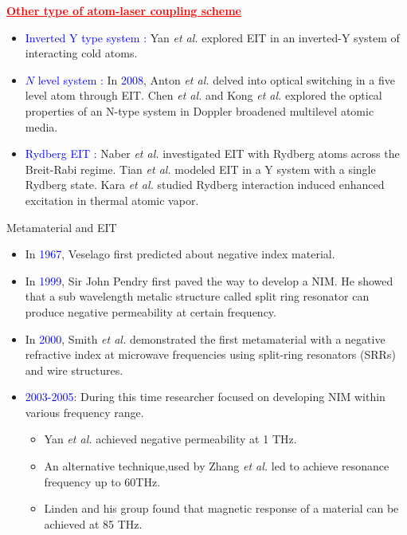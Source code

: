 \documentclass[9pt,aspectratio94]{beamer}
\begin{document}
\begin{frame}
\begin{center}
    \textcolor{red}{\underline{\textbf{Other type of atom-laser coupling scheme}}}
\end{center}

\begin{itemize}
    \item \textcolor{blue}{Inverted Y type system :} Yan \textit{et al.} explored EIT in an inverted-Y system of interacting cold atoms.
   
    \item \textcolor{blue}{$N$ level system :} In \textcolor{blue}{2008}, Anton \textit{et al.} delved into optical switching in a five level atom through EIT. Chen \textit{et al.} and Kong \textit{et al.} explored the optical properties of an N-type system in Doppler broadened multilevel atomic media.
    \item \textcolor{blue}{Rydberg EIT :} Naber \textit{et al.} investigated EIT with Rydberg atoms across the Breit-Rabi regime. Tian \textit{et al.}  modeled EIT in a Y system with a single Rydberg state. Kara \textit{et al.} studied Rydberg interaction induced enhanced excitation in thermal atomic vapor.
  \end{itemize}
 \end{frame}
 \fi
    \begin{frame}{Metamaterial and EIT}
    \begin{itemize}
        \item In \textcolor{blue}{1967}, Veselago first predicted about negative index material.
        \item In \textcolor{blue}{1999}, Sir John Pendry first paved the way to develop a NIM. He showed that a sub wavelength metalic structure called split ring resonator can produce negative permeability at certain frequency.
        \item In \textcolor{blue}{2000}, Smith \textit{et al.} demonstrated the first metamaterial with a negative refractive index at microwave frequencies using split-ring resonators (SRRs) and wire structures.
        \item \textcolor{blue}{2003-2005}: During this time researcher focused on developing NIM within various frequency range.
        \begin{itemize}
            \item  Yan \textit{et al.} achieved negative permeability at 1 THz.
         \item An alternative technique,used by Zhang \textit{et al.} led to achieve resonance frequency up to 60THz.

         \item Linden and his group found that magnetic response of a material can be achieved at 85 THz. 
        \end{itemize}
        
    \end{itemize}
       \end{frame}
\end{document}
